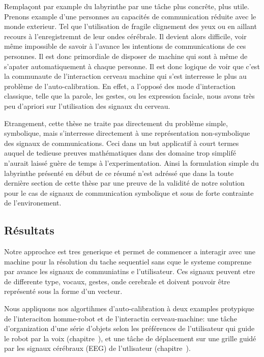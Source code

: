 Remplaçont par example du labyrinthe par une tâche plus concrête, plus utile. Prenons example d'une personnes  au capacités de communication réduite avec le monde exterieur. Tel que l'utilisation de fragile clignement des yeux ou en aillant recours à l'enregistremnt de leur ondes cérébrale. Il devient alors difficile, voir même impossible de savoir à l'avance les intentions de communications de ces personnes. Il est donc primordiale de disposer de machine qui sont à même de s'apater automatiquement à chaque personne. Il est donc logique de voir que c'est la communaute de l'interaction cerveau machine qui s'est interresse le plus au problème de l'auto-calibration. En effet, a l'opposé des mode d'interaction classique, telle que la parole, les gestes, ou les expression faciale, nous avons très peu d'apriori sur l'utilisation des signaux du cerveau.

Etrangement, cette thèse ne traite pas directement du problème simple, symbolique, mais s'interresse directement à une représentation non-symbolique des signaux de communications. Ceci dans un but applicatif à court termes auquel de tedieuse preuves mathématiques dans des domaine trop simplifé n'aurait laissé guère de temps à l'experimentation. Ainsi la formulation simple du labyrinthe présenté en début de ce résumé n'est adréssé que dans la toute dernière section de cette thèse par une preuve de la validité de notre solution pour le cas de signaux de communication symbolique et sous de forte contrainte de l'environement.

\subsection*{Résultats}

Notre approchce est tres generique et permet de commencer a interagir avec une machine pour la résolution du tache sequentiel sans cque le systeme comprenne par avance les signaux de communiatins e l'utilisateur. Ces signaux peuvent etre de differente type, vocaux, gestes, onde cerebrale et doivent pouvoir être représenté sous la forme d'un vecteur.

Nous appliquons nos algortihmes d'auto-calibration à deux examples protypique de l'interaciton homme-robot et de l'interactin cerveau-machine: une tâche d'organization d'une série d'objets selon les préférences de l'utilisateur qui guide le robot par la voix (chapitre~), et une tâche de déplacement sur une grille guidé par les signaux cérébraux (EEG) de l'utlisateur (chapitre~).

